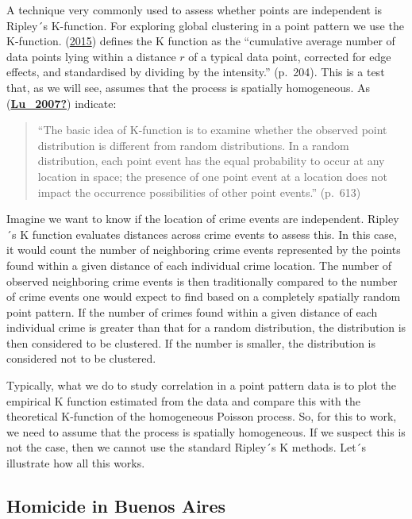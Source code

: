 \documentclass[
  krantz2]{krantz}
\begin{document}
A technique very commonly used to assess whether points are independent is Ripley´s K-function. For exploring global clustering in a point pattern we use the K-function. (\protect\hyperlink{ref-Baddeley_2016}{2015}) defines the K function as the ``cumulative average number of data points lying within a distance \(r\) of a typical data point, corrected for edge effects, and standardised by dividing by the intensity.'' (p.~204). This is a test that, as we will see, assumes that the process is spatially homogeneous. As (\protect\hyperlink{ref-Lu_2007}{\textbf{Lu\_2007?}}) indicate:

\begin{quote}
``The basic idea of K-function is to examine whether the observed point distribution is different from random distributions. In a random distribution, each point event has the equal probability to occur at any location in space; the presence of one point event at a location does not impact the occurrence possibilities of other point events.'' (p.~613)
\end{quote}

Imagine we want to know if the location of crime events are independent. Ripley´s K function evaluates distances across crime events to assess this. In this case, it would count the number of neighboring crime events represented by the points found within a given distance of each individual crime location. The number of observed neighboring crime events is then traditionally compared to the number of crime events one would expect to find based on a completely spatially random point pattern. If the number of crimes found within a given distance of each individual crime is greater than that for a random distribution, the distribution is then considered to be clustered. If the number is smaller, the distribution is considered not to be clustered.

Typically, what we do to study correlation in a point pattern data is to plot the empirical K function estimated from the data and compare this with the theoretical K-function of the homogeneous Poisson process. So, for this to work, we need to assume that the process is spatially homogeneous. If we suspect this is not the case, then we cannot use the standard Ripley´s K methods. Let´s illustrate how all this works.

\hypertarget{homicide-in-buenos-aires}{%
\subsection{Homicide in Buenos Aires}\label{homicide-in-buenos-aires}}
\end{document}
